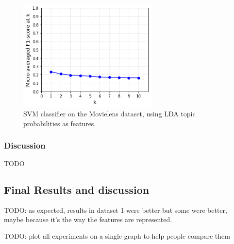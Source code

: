 \begin{figure}[H]
    \centering
    \includegraphics[width=7cm]{chapters/05_experiments/images/svm-lda-tf-idf-movielens.png}
    \caption{SVM classifier on the Movielens dataset, using LDA topic probabilities as features.}
    \label{fig:svm_lda_movielens}
\end{figure}

\subsubsection{Discussion}

{\color{red} TODO}

\subsection{Final Results and discussion}

{\color{red} TODO: as expected, results in dataset 1 were better but some were better, maybe because it's the way the features are represented.}

{\color{red} TODO: plot all experiments on a single graph to help people compare them}

